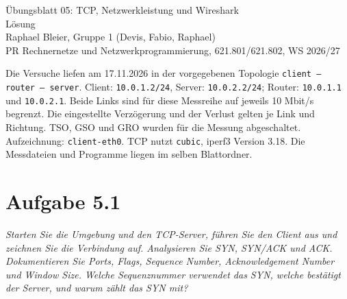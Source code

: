 \documentclass[a4paper,11pt]{article}
\newif\ifexplain
\newcommand{\aufgabe}[1]{\section*{Aufgabe #1}}
\newcommand{\angabe}[1]{\textit{#1}\par\smallskip}
\begin{document}
\begin{center}
{\Large Übungsblatt 05: TCP, Netzwerkleistung und Wireshark}\\
\ifexplain Erklärung\else Lösung\fi\\
Raphael Bleier, Gruppe 1 (Devis, Fabio, Raphael)\\
PR Rechnernetze und Netzwerkprogrammierung, 621.801/621.802, WS 2026/27
\end{center}

Die Versuche liefen am 17.11.2026 in der vorgegebenen Topologie
\texttt{client -- router -- server}. Client: \texttt{10.0.1.2/24}, Server:
\texttt{10.0.2.2/24}; Router: \texttt{10.0.1.1} und \texttt{10.0.2.1}.
Beide Links sind für diese Messreihe auf jeweils 10 Mbit/s begrenzt.
Die eingestellte Verzögerung und der Verlust gelten je Link und Richtung.
TSO, GSO und GRO wurden für die Messung abgeschaltet. Aufzeichnung:
\texttt{client-eth0}. TCP nutzt \texttt{cubic}, iperf3 Version 3.18.
Die Messdateien und Programme liegen im selben Blattordner.

\aufgabe{5.1}
\angabe{Starten Sie die Umgebung und den TCP-Server, führen Sie den Client aus und zeichnen Sie die Verbindung auf. Analysieren Sie SYN, SYN/ACK und ACK. Dokumentieren Sie Ports, Flags, Sequence Number, Acknowledgement Number und Window Size. Welche Sequenznummer verwendet das SYN, welche bestätigt der Server, und warum zählt das SYN mit?}
\end{document}

